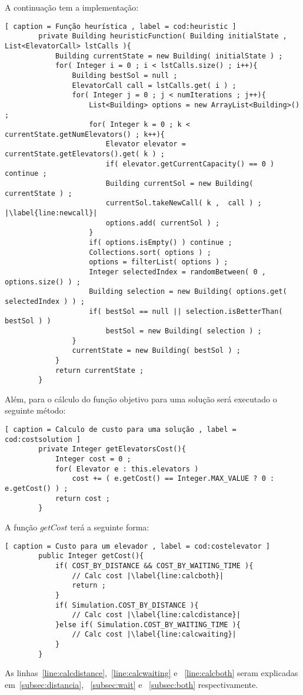 	A continuação tem a implementação:
	\begin{lstlisting}[ caption = Função heurística , label = cod:heuristic ]
		private Building heuristicFunction( Building initialState , List<ElevatorCall> lstCalls ){
			Building currentState = new Building( initialState ) ;
			for( Integer i = 0 ; i < lstCalls.size() ; i++){
				Building bestSol = null ;
				ElevatorCall call = lstCalls.get( i ) ;
				for( Integer j = 0 ; j < numIterations ; j++){
					List<Building> options = new ArrayList<Building>() ;
					for( Integer k = 0 ; k < currentState.getNumElevators() ; k++){
						Elevator elevator = currentState.getElevators().get( k ) ;
						if( elevator.getCurrentCapacity() == 0 ) continue ;
						Building currentSol = new Building( currentState ) ;
						currentSol.takeNewCall( k ,  call ) ; |\label{line:newcall}|
						options.add( currentSol ) ;
					}
					if( options.isEmpty() ) continue ;
					Collections.sort( options ) ;
					options = filterList( options ) ;
					Integer selectedIndex = randomBetween( 0 ,  options.size() ) ;
					Building selection = new Building( options.get( selectedIndex ) ) ;
					if( bestSol == null || selection.isBetterThan( bestSol ) )
						bestSol = new Building( selection ) ;
				}
				currentState = new Building( bestSol ) ;
			}
			return currentState ;
		}
	\end{lstlisting}
	
	Além, para o cálculo do função objetivo para uma solução será executado o seguinte método:
	\begin{lstlisting}[ caption = Calculo de custo para uma solução , label = cod:costsolution ]
		private Integer getElevatorsCost(){
			Integer cost = 0 ;
			for( Elevator e : this.elevators )
				cost += ( e.getCost() == Integer.MAX_VALUE ? 0 : e.getCost() ) ;
			return cost ;
		}
	\end{lstlisting}
	
	A função ${getCost}$ terá a seguinte forma:
	\begin{lstlisting}[ caption = Custo para um elevador , label = cod:costelevator ]
		public Integer getCost(){
			if( COST_BY_DISTANCE && COST_BY_WAITING_TIME ){
				// Calc cost |\label{line:calcboth}|
				return ;
			}
			if( Simulation.COST_BY_DISTANCE ){
				// Calc cost |\label{line:calcdistance}|
			}else if( Simulation.COST_BY_WAITING_TIME ){
				// Calc cost |\label{line:calcwaiting}|
			}
		}
	\end{lstlisting}
	As linhas~\ref{line:calcdistance},~\ref{line:calcwaiting} e ~\ref{line:calcboth} seram explicadas em~\ref{subsec:distancia}, ~\ref{subsec:wait} e ~\ref{subsec:both} respectivamente.

